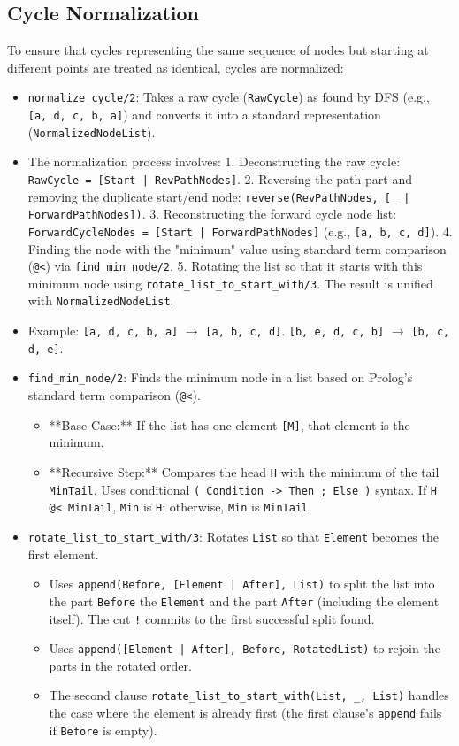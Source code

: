 \documentclass[12pt,a4paper]{article}
\begin{document}
\subsection{Cycle Normalization}
To ensure that cycles representing the same sequence of nodes but starting at different points are treated as identical, cycles are normalized:
\begin{itemize}
    \item \texttt{normalize\_cycle/2}: Takes a raw cycle (\texttt{RawCycle}) as found by DFS (e.g., \texttt{[a, d, c, b, a]}) and converts it into a standard representation (\texttt{NormalizedNodeList}).
    \item The normalization process involves:
        1. Deconstructing the raw cycle: \texttt{RawCycle = [Start | RevPathNodes]}.
        2. Reversing the path part and removing the duplicate start/end node: \texttt{reverse(RevPathNodes, [\_ | ForwardPathNodes])}.
        3. Reconstructing the forward cycle node list: \texttt{ForwardCycleNodes = [Start | ForwardPathNodes]} (e.g., \texttt{[a, b, c, d]}).
        4. Finding the node with the "minimum" value using standard term comparison (\texttt{@<}) via \texttt{find\_min\_node/2}.
        5. Rotating the list so that it starts with this minimum node using \texttt{rotate\_list\_to\_start\_with/3}. The result is unified with \texttt{NormalizedNodeList}.
    \item Example: \texttt{[a, d, c, b, a]} $\rightarrow$ \texttt{[a, b, c, d]}. \texttt{[b, e, d, c, b]} $\rightarrow$ \texttt{[b, c, d, e]}.
    \item \texttt{find\_min\_node/2}: Finds the minimum node in a list based on Prolog's standard term comparison (\texttt{@<}).
        \begin{itemize}
            \item **Base Case:** If the list has one element \texttt{[M]}, that element is the minimum.
            \item **Recursive Step:** Compares the head \texttt{H} with the minimum of the tail \texttt{MinTail}. Uses conditional \texttt{( Condition -> Then ; Else )} syntax. If \texttt{H @< MinTail}, \texttt{Min} is \texttt{H}; otherwise, \texttt{Min} is \texttt{MinTail}.
        \end{itemize}
    \item \texttt{rotate\_list\_to\_start\_with/3}: Rotates \texttt{List} so that \texttt{Element} becomes the first element.
        \begin{itemize}
            \item Uses \texttt{append(Before, [Element | After], List)} to split the list into the part \texttt{Before} the \texttt{Element} and the part \texttt{After} (including the element itself). The cut \texttt{!} commits to the first successful split found.
            \item Uses \texttt{append([Element | After], Before, RotatedList)} to rejoin the parts in the rotated order.
            \item The second clause \texttt{rotate\_list\_to\_start\_with(List, \_, List)} handles the case where the element is already first (the first clause's \texttt{append} fails if \texttt{Before} is empty).
        \end{itemize}
\end{itemize}
\end{document}
